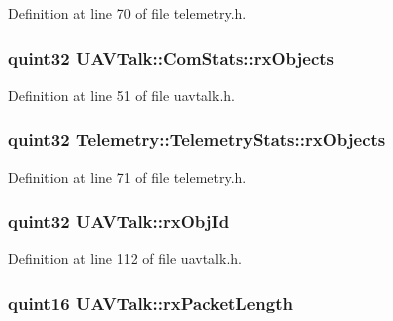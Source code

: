 Definition at line 70 of file telemetry.\-h.

\hypertarget{group___u_a_v_talk_plugin_ga60c07de32f4130a7b761066819bf0712}{
\subsubsection[{rx\-Objects}]{\setlength{\rightskip}{0pt plus 5cm}quint32 U\-A\-V\-Talk\-::\-Com\-Stats\-::rx\-Objects}}\label{group___u_a_v_talk_plugin_ga60c07de32f4130a7b761066819bf0712}


Definition at line 51 of file uavtalk.\-h.

\hypertarget{group___u_a_v_talk_plugin_gacd544f271fc6ee0f5eb72dc101a23c21}{
\subsubsection[{rx\-Objects}]{\setlength{\rightskip}{0pt plus 5cm}quint32 Telemetry\-::\-Telemetry\-Stats\-::rx\-Objects}}\label{group___u_a_v_talk_plugin_gacd544f271fc6ee0f5eb72dc101a23c21}


Definition at line 71 of file telemetry.\-h.

\hypertarget{group___u_a_v_talk_plugin_ga922e3ea36927c84023cfb0cf719c9aa0}{
\subsubsection[{rx\-Obj\-Id}]{\setlength{\rightskip}{0pt plus 5cm}quint32 U\-A\-V\-Talk\-::rx\-Obj\-Id\hspace{0.3cm}{\ttfamily [protected]}}}\label{group___u_a_v_talk_plugin_ga922e3ea36927c84023cfb0cf719c9aa0}


Definition at line 112 of file uavtalk.\-h.

\hypertarget{group___u_a_v_talk_plugin_ga8ce408e2fe258de7a15c77540055a81d}{
\subsubsection[{rx\-Packet\-Length}]{\setlength{\rightskip}{0pt plus 5cm}quint16 U\-A\-V\-Talk\-::rx\-Packet\-Length\hspace{0.3cm}{\ttfamily [protected]}}}\label{group___u_a_v_talk_plugin_ga8ce408e2fe258de7a15c77540055a81d}


